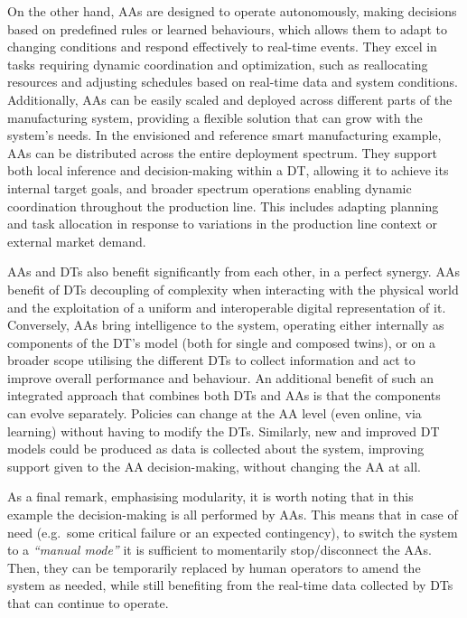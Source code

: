 On the other hand, AAs are designed to operate autonomously, making decisions based on predefined rules or learned behaviours, which allows them to adapt to changing conditions and respond effectively to real-time events. They excel in tasks requiring dynamic coordination and optimization, such as reallocating resources and adjusting schedules based on real-time data and system conditions. Additionally, AAs can be easily scaled and deployed across different parts of the manufacturing system, providing a flexible solution that can grow with the system's needs.
%
In the envisioned and reference smart manufacturing example, AAs can be distributed across the entire deployment spectrum. They support both local inference and decision-making within a DT, allowing it to achieve its internal target goals, and broader spectrum operations enabling dynamic coordination throughout the production line. This includes adapting planning and task allocation in response to variations in the production line context or external market demand. 

AAs and DTs also benefit significantly from each other, in a perfect synergy. 
AAs benefit of DTs decoupling of complexity when interacting with the physical world and the exploitation of a uniform and interoperable digital representation of it. Conversely, AAs bring intelligence to the system, operating either internally as components of the DT's model (both for single and composed twins), or on a broader scope utilising the different DTs to collect information and act to improve overall performance and behaviour.
%
An additional benefit of such an integrated approach that combines both DTs and AAs is that the components can evolve separately.
%
Policies can change at the AA level (even online, via learning) without having to modify the DTs. 
Similarly, new and improved DT models could be produced as data is collected about the system, improving support given to the AA decision-making, without changing the AA at all. %

As a final remark, emphasising modularity, it is worth noting that in this example the decision-making is all performed by AAs. This means that in case of need (e.g.\ some critical failure or an expected contingency), to switch the system to a \textit{``manual mode''} it is sufficient to momentarily stop/disconnect the AAs. 
Then, they can be temporarily replaced by human operators to amend the system as needed, while still benefiting from the real-time data collected by DTs that can continue to operate. 

